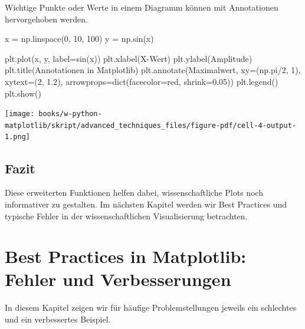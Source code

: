 \documentclass[
  letterpaper,
  DIV=11,
  numbers=noendperiod]{scrreprt}
\newenvironment{Shaded}{\begin{snugshade}}{\end{snugshade}}
\newcommand{\BuiltInTok}[1]{\textcolor[rgb]{0.00,0.23,0.31}{#1}}
\newcommand{\DecValTok}[1]{\textcolor[rgb]{0.68,0.00,0.00}{#1}}
\newcommand{\FloatTok}[1]{\textcolor[rgb]{0.68,0.00,0.00}{#1}}
\newcommand{\NormalTok}[1]{\textcolor[rgb]{0.00,0.23,0.31}{#1}}
\newcommand{\OperatorTok}[1]{\textcolor[rgb]{0.37,0.37,0.37}{#1}}
\newcommand{\StringTok}[1]{\textcolor[rgb]{0.13,0.47,0.30}{#1}}
\begin{document}
Wichtige Punkte oder Werte in einem Diagramm können mit Annotationen
hervorgehoben werden.

\begin{Shaded}
\begin{Highlighting}[]
\NormalTok{x }\OperatorTok{=}\NormalTok{ np.linspace(}\DecValTok{0}\NormalTok{, }\DecValTok{10}\NormalTok{, }\DecValTok{100}\NormalTok{)}
\NormalTok{y }\OperatorTok{=}\NormalTok{ np.sin(x)}

\NormalTok{plt.plot(x, y, label}\OperatorTok{=}\StringTok{\textquotesingle{}sin(x)\textquotesingle{}}\NormalTok{)}
\NormalTok{plt.xlabel(}\StringTok{\textquotesingle{}X{-}Wert\textquotesingle{}}\NormalTok{)}
\NormalTok{plt.ylabel(}\StringTok{\textquotesingle{}Amplitude\textquotesingle{}}\NormalTok{)}
\NormalTok{plt.title(}\StringTok{\textquotesingle{}Annotationen in Matplotlib\textquotesingle{}}\NormalTok{)}
\NormalTok{plt.annotate(}\StringTok{\textquotesingle{}Maximalwert\textquotesingle{}}\NormalTok{, xy}\OperatorTok{=}\NormalTok{(np.pi}\OperatorTok{/}\DecValTok{2}\NormalTok{, }\DecValTok{1}\NormalTok{), xytext}\OperatorTok{=}\NormalTok{(}\DecValTok{2}\NormalTok{, }\FloatTok{1.2}\NormalTok{),}
\NormalTok{             arrowprops}\OperatorTok{=}\BuiltInTok{dict}\NormalTok{(facecolor}\OperatorTok{=}\StringTok{\textquotesingle{}red\textquotesingle{}}\NormalTok{, shrink}\OperatorTok{=}\FloatTok{0.05}\NormalTok{))}
\NormalTok{plt.legend()}
\NormalTok{plt.show()}
\end{Highlighting}
\end{Shaded}

\texttt{[image: books/w-python-matplotlib/skript/advanced\_techniques\_files/figure-pdf/cell-4-output-1.png]}

\section{Fazit}\label{fazit-2}

Diese erweiterten Funktionen helfen dabei, wissenschaftliche Plots noch
informativer zu gestalten. Im nächsten Kapitel werden wir Best Practices
und typische Fehler in der wissenschaftlichen Visualisierung betrachten.

\chapter{Best Practices in Matplotlib: Fehler und
Verbesserungen}\label{best-practices-in-matplotlib-fehler-und-verbesserungen}

In diesem Kapitel zeigen wir für häufige Problemstellungen jeweils ein
schlechtes und ein verbessertes Beispiel.
\end{document}
